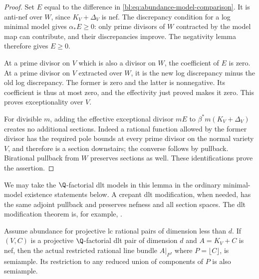 \begin{proof}
Set $E$ equal to the difference in
\eqref{bl:eq:abundance-model-comparison}.  It is anti-nef over $W$, since
$K_V+\Delta_V$ is nef.  The discrepancy condition for a log minimal
model gives $\alpha_*E\geq0$: only prime divisors of $W$ contracted
by the model map can contribute, and their discrepancies improve.
The negativity lemma therefore gives $E\geq0$.

At a prime divisor on $V$ which is also a divisor on $W$, the
coefficient of $E$ is zero.  At a prime divisor on $V$ extracted over
$W$, it is the new log discrepancy minus the old log discrepancy.
The former is zero and the latter is nonnegative.  Its coefficient
is thus at most zero, and the effectivity just proved makes it zero.
This proves exceptionality over $V$.

For divisible $m$, adding the effective exceptional divisor $mE$
to $\beta^*m(K_V+\Delta_V)$ creates no additional sections.
Indeed a rational function allowed by the former divisor has the
required pole bounds at every prime divisor on the normal variety
$V$, and therefore is a section downstairs; the converse follows
by pullback.  Birational pullback from $W$ preserves sections as
well.  These identifications prove the assertion.
\end{proof}

We may take the $\Q$-factorial dlt models in this lemma in the
ordinary minimal-model existence statements below.  A crepant dlt
modification, when needed, has the same adjoint pullback and preserves
nefness and all section spaces.  The dlt modification theorem is,
for example, \cite[Theorem~2.8]{FujinoGongyo2014}.

\begin{lemma}
\label{bl:lem:abundance-floor}
Assume abundance for projective lc rational pairs of dimension less
than $d$.  If $(V,C)$ is a projective $\Q$-factorial dlt pair of
dimension $d$ and $A=K_V+C$ is nef, then the actual restricted
rational line bundle $A|_P$, where $P=\lfloor C\rfloor$, is
semiample.  Its restriction to any reduced union of components of
$P$ is also semiample.
\end{lemma}


